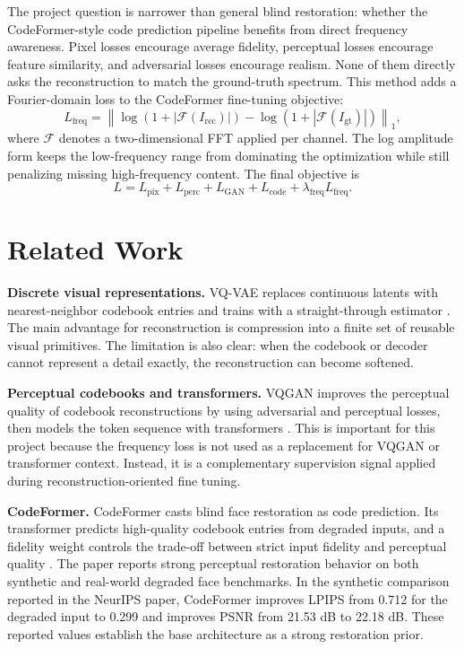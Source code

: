 \documentclass[10pt,twocolumn,letterpaper]{article}
\begin{document}
The project question is narrower than general blind restoration: whether the CodeFormer-style code prediction pipeline benefits from direct frequency awareness. Pixel losses encourage average fidelity, perceptual losses encourage feature similarity, and adversarial losses encourage realism. None of them directly asks the reconstruction to match the ground-truth spectrum. This method adds a Fourier-domain loss to the CodeFormer fine-tuning objective:
\begin{equation}
L_{\mathrm{freq}} = \left\|\log(1 + |\mathcal{F}(I_{\mathrm{rec}})|) - \log(1 + |\mathcal{F}(I_{\mathrm{gt}})|)\right\|_1,
\end{equation}
where $\mathcal{F}$ denotes a two-dimensional FFT applied per channel. The log amplitude form keeps the low-frequency range from dominating the optimization while still penalizing missing high-frequency content. The final objective is
\begin{equation}
L = L_{\mathrm{pix}} + L_{\mathrm{perc}} + L_{\mathrm{GAN}} + L_{\mathrm{code}} + \lambda_{\mathrm{freq}} L_{\mathrm{freq}}.
\end{equation}

\section{Related Work}
\textbf{Discrete visual representations.} VQ-VAE replaces continuous latents with nearest-neighbor codebook entries and trains with a straight-through estimator \cite{oord2017vqvae}. The main advantage for reconstruction is compression into a finite set of reusable visual primitives. The limitation is also clear: when the codebook or decoder cannot represent a detail exactly, the reconstruction can become softened.

\textbf{Perceptual codebooks and transformers.} VQGAN improves the perceptual quality of codebook reconstructions by using adversarial and perceptual losses, then models the token sequence with transformers \cite{esser2021taming}. This is important for this project because the frequency loss is not used as a replacement for VQGAN or transformer context. Instead, it is a complementary supervision signal applied during reconstruction-oriented fine tuning.

\textbf{CodeFormer.} CodeFormer casts blind face restoration as code prediction. Its transformer predicts high-quality codebook entries from degraded inputs, and a fidelity weight controls the trade-off between strict input fidelity and perceptual quality \cite{zhou2022codeformer}. The paper reports strong perceptual restoration behavior on both synthetic and real-world degraded face benchmarks. In the synthetic comparison reported in the NeurIPS paper, CodeFormer improves LPIPS from 0.712 for the degraded input to 0.299 and improves PSNR from 21.53 dB to 22.18 dB. These reported values establish the base architecture as a strong restoration prior.
\end{document}
